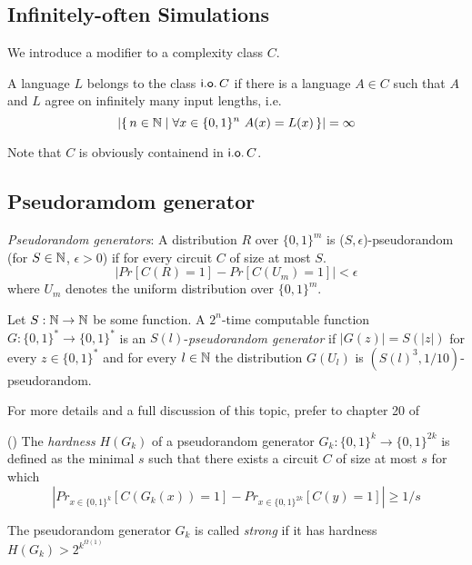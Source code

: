\documentclass[11pt]{article}
\begin{document}
\subsection{Infinitely-often Simulations}

We introduce a modifier to a complexity class $C$.

\begin{definition}
  A language $L$ belongs to the class
  $\mathsf{i.o.}\, C$ if there is a language $A \in C$ such that
  $A$ and $L$ agree on infinitely many input lengths, i.e.
  \[
    |\set{ n \in \N \mid \forall x \in \{0,1\}^n\ A(x) = L(x) }| = \infty
  \]
\end{definition}

Note that $C$ is obviously containend in $\mathsf{i.o.}\, C$.



\subsection{Pseudoramdom generator}
\label{pseudorandom}
\begin{definition}
	\textit{Pseudorandom generators}: A distribution $R$ over $\{0, 1\}^m$ is ($S, \epsilon$)-pseudorandom (for $S \in {\mathbb{N}}$, $\epsilon > 0$) if for every circuit $C$ of size at most $S$.
	\[|Pr[C(R) = 1] - Pr[C(U_m) = 1]| < \epsilon\]
	where $U_m$ denotes the uniform distribution over $\{0, 1\}^m$.
	
	Let $S: {\mathbb{N}} \rightarrow {\mathbb{N}}$ be some function. A $2^n$-time computable function $G: \{0, 1\}^* \rightarrow \{0, 1\}^*$ is an $S(l)$-\textit{pseudorandom generator} if $|G(z)| = S(|z|)$ for every $z \in \{0, 1\}^*$ and for every $l \in {\mathbb{N}}$ the distribution $G(U_l)$ is $(S(l)^3, 1/10)$-pseudorandom.
	
	For more details and a full discussion of this topic, prefer to chapter 20 of \cite{arora2009}
\end{definition}

\begin{definition} (\cite{10.1145/335305.335314})
	The \textit{hardness} $H(G_k)$ of a pseudorandom generator $G_k: \{0, 1\}^k \rightarrow \{0, 1\}^{2k}$ is defined as the minimal $s$ such that there exists a circuit $C$ of size at most $s$ for which
	\[|Pr_{x \in \{0, 1\}^k}[C(G_k(x)) = 1] - Pr_{x \in \{0, 1\}^{2k}}[C(y) = 1]| \geq 1/s\]
	
	The pseudorandom generator $G_k$ is called \textit{strong} if it has hardness $H(G_k) > 2^{k^{\Omega(1)}}$ 
\end{definition}
\end{document}
